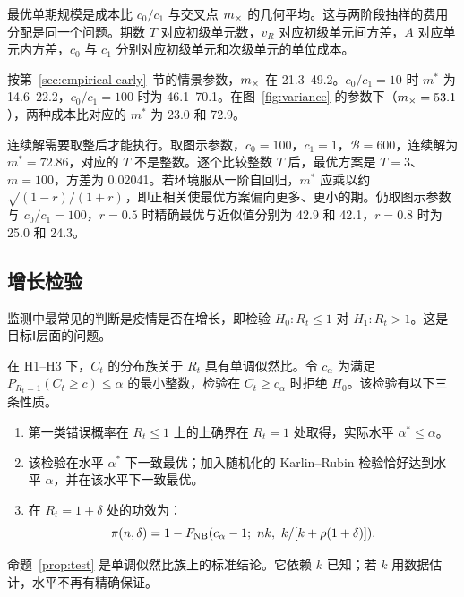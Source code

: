 最优单期规模是成本比 $c_0/c_1$ 与交叉点 $m_{\times}$ 的几何平均。这与两阶段抽样的费用分配是同一个问题\citep{cochran1977sampling}。期数 $T$ 对应初级单元数，$v_R$ 对应初级单元间方差，$A$ 对应单元内方差，$c_0$ 与 $c_1$ 分别对应初级单元和次级单元的单位成本。

按第~\ref{sec:empirical-early}~节的情景参数，$m_{\times}$ 在 21.3--49.2。$c_0/c_1=10$ 时 $m^*$ 为 14.6--22.2，$c_0/c_1=100$ 时为 46.1--70.1。在图~\ref{fig:variance} 的参数下（$m_{\times}=53.1$），两种成本比对应的 $m^*$ 为 23.0 和 72.9。

连续解需要取整后才能执行。取图示参数，$c_0=100$，$c_1=1$，$\mathcal B=600$，连续解为 $m^*=72.86$，对应的 $T$ 不是整数。逐个比较整数 $T$ 后，最优方案是 $T=3$、$m=100$，方差为 0.02041。若环境服从一阶自回归，$m^*$ 应乘以约 $\sqrt{(1-r)/(1+r)}$，即正相关使最优方案偏向更多、更小的期。仍取图示参数与 $c_0/c_1=100$，$r=0.5$ 时精确最优与近似值分别为 42.9 和 42.1，$r=0.8$ 时为 25.0 和 24.3。

\subsection{增长检验}
\label{sec:design-test}

监测中最常见的判断是疫情是否在增长，即检验 $H_0\colon R_t\leq1$ 对 $H_1\colon R_t>1$。这是目标Ⅰ层面的问题。

\begin{proposition}[精确增长检验]
\label{prop:test}
在 H1--H3 下，$C_t$ 的分布族关于 $R_t$ 具有单调似然比。令 $c_\alpha$ 为满足 $P_{R_t=1}(C_t\geq c)\leq\alpha$ 的最小整数，检验在 $C_t\geq c_\alpha$ 时拒绝 $H_0$。该检验有以下三条性质。
\begin{enumerate}[label=(\roman*)]
  \item 第一类错误概率在 $R_t\leq1$ 上的上确界在 $R_t=1$ 处取得，实际水平 $\alpha^*\leq\alpha$。
  \item 该检验在水平 $\alpha^*$ 下一致最优；加入随机化的 Karlin--Rubin 检验恰好达到水平 $\alpha$，并在该水平下一致最优。
  \item 在 $R_t=1+\delta$ 处的功效为：
  \begin{equation}
    \pi(n,\delta)=1-F_{\NB}(c_\alpha-1;\ nk,\ k/[k+\rho(1+\delta)]).
    \label{eq:power}
  \end{equation}
\end{enumerate}
\end{proposition}

命题~\ref{prop:test} 是单调似然比族上的标准结论\citep{karlin1956theory, lehmann2005testing}。它依赖 $k$ 已知；若 $k$ 用数据估计，水平不再有精确保证。

